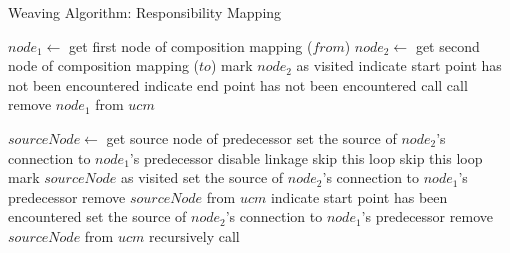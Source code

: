 \begin{algorithm}
    \caption{Weaving Algorithm: Responsibility Mapping}
    \label{alg:1}
	\begin{algorithmic}[1]
			\State $node_1\gets$ get first node of composition mapping ($from$)
			\State $node_2\gets$ get second node of composition mapping ($to$)
			\State mark $node_2$ as visited
			\State indicate start point has not been encountered
			\State indicate end point has not been encountered
			\State call 
			\State call 
			\State remove $node_1$ from $ucm$
		\EndFunction
		
				\State $sourceNode\gets$ get source node of predecessor
				 \label{alg:1.1}
					\State set the source of $node_2$'s connection to $node_1$'s predecessor
					\State disable linkage
					\State skip this loop
				\EndIf \label{alg:1.2}
				 \label{alg:1.3}
					\State skip this loop
					\State mark $sourceNode$ as visited
				\EndIf \label{alg:1.4}
				 \label{alg:1.5}
						\State set the source of $node_2$'s connection to $node_1$'s predecessor
						\State remove $sourceNode$ from $ucm$
						\State indicate start point has been encountered
					\EndIf \label{alg:1.6}
				 \label{alg:1.7}
					\State set the source of $node_2$'s connection to $node_1$'s predecessor
						\State remove $sourceNode$ from $ucm$
					\EndIf \label{alg:1.8}
				\Else
					\State recursively call  \label{alg:1.9}
				\EndIf
			\EndFor
		\EndFunction
		
	\end{algorithmic}
\end{algorithm}

